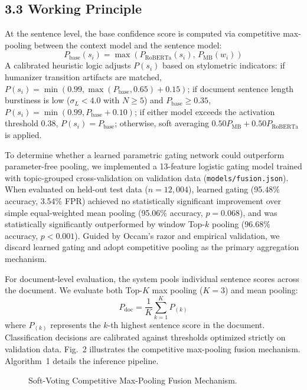 \documentclass[conference]{IEEEtran}
\begin{document}
\subsection{3.3 Working Principle}
At the sentence level, the base confidence score is computed via competitive max-pooling between the context model and the sentence model:
\begin{equation}
    P_{\text{base}}(s_i) = \max\left( P_{\text{RoBERTa}}(s_i),\, P_{\text{MB}}(w_i) \right)
\end{equation}
A calibrated heuristic logic adjusts $P(s_i)$ based on stylometric indicators: if humanizer transition artifacts are matched, $P(s_i) = \min(0.99, \max(P_{\text{base}}, 0.65) + 0.15)$; if document sentence length burstiness is low ($\sigma_L < 4.0$ with $N \ge 5$) and $P_{\text{base}} \ge 0.35$, $P(s_i) = \min(0.99, P_{\text{base}} + 0.10)$; if either model exceeds the activation threshold 0.38, $P(s_i) = P_{\text{base}}$; otherwise, soft averaging $0.50 P_{\text{MB}} + 0.50 P_{\text{RoBERTa}}$ is applied.

To determine whether a learned parametric gating network could outperform parameter-free pooling, we implemented a 13-feature logistic gating model trained with topic-grouped cross-validation on validation data (\texttt{models/fusion.json}). When evaluated on held-out test data ($n=12,004$), learned gating (95.48\% accuracy, 3.54\% FPR) achieved no statistically significant improvement over simple equal-weighted mean pooling (95.06\% accuracy, $p = 0.068$), and was statistically significantly outperformed by window Top-$k$ pooling (96.68\% accuracy, $p < 0.001$). Guided by Occam's razor and empirical validation, we discard learned gating and adopt competitive pooling as the primary aggregation mechanism.

For document-level evaluation, the system pools individual sentence scores across the document. We evaluate both Top-$K$ max pooling ($K=3$) and mean pooling:
\begin{equation}
    P_{\text{doc}} = \frac{1}{K} \sum_{k=1}^K P_{(k)}
\end{equation}
where $P_{(k)}$ represents the $k$-th highest sentence score in the document. Classification decisions are calibrated against thresholds optimized strictly on validation data. Fig.~2 illustrates the competitive max-pooling fusion mechanism. Algorithm~1 details the inference pipeline.

\begin{figure}[htbp]
\centerline{}
\caption{Soft-Voting Competitive Max-Pooling Fusion Mechanism.}
\label{fig_competitive_pooling}
\end{figure}
\end{document}
